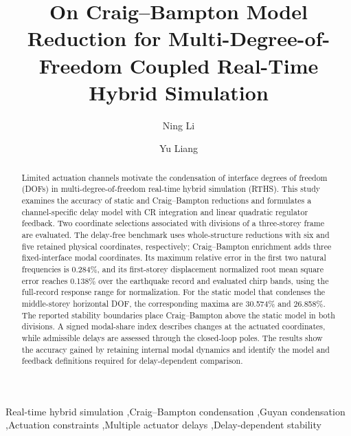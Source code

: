 \documentclass[a4paper,fleqn,review,12pt]{cas-sc}
\numberwithin{equation}{section}
\begin{document}
\let\WriteBookmarks\relax
\def\floatpagepagefraction{1}
\def\textpagefraction{.001}

\title[mode=title]{On Craig--Bampton Model Reduction for Multi-Degree-of-Freedom Coupled Real-Time Hybrid Simulation}

\author{Ning Li}
\author{Yu Liang}

\begin{abstract}
Limited actuation channels motivate the condensation of interface degrees of freedom (DOFs) in multi-degree-of-freedom real-time hybrid simulation (RTHS). This study examines the accuracy of static and Craig--Bampton reductions and formulates a channel-specific delay model with CR integration and linear quadratic regulator feedback. Two coordinate selections associated with divisions of a three-storey frame are evaluated. The delay-free benchmark uses whole-structure reductions with six and five retained physical coordinates, respectively; Craig--Bampton enrichment adds three fixed-interface modal coordinates. Its maximum relative error in the first two natural frequencies is 0.284\%, and its first-storey displacement normalized root mean square error reaches 0.138\% over the earthquake record and evaluated chirp bands, using the full-record response range for normalization. For the static model that condenses the middle-storey horizontal DOF, the corresponding maxima are 30.574\% and 26.858\%. The reported stability boundaries place Craig--Bampton above the static model in both divisions. A signed modal-share index describes changes at the actuated coordinates, while admissible delays are assessed through the closed-loop poles. The results show the accuracy gained by retaining internal modal dynamics and identify the model and feedback definitions required for delay-dependent comparison.
\end{abstract}

\begin{keywords}
	\raggedright
	Real-time hybrid simulation
	\sep Craig--Bampton condensation
	\sep Guyan condensation
	\sep Actuation constraints
	\sep Multiple actuator delays
	\sep Delay-dependent stability
\end{keywords}

\shorttitle{\mbox{}}

\maketitle
\linenumbers
\end{document}
